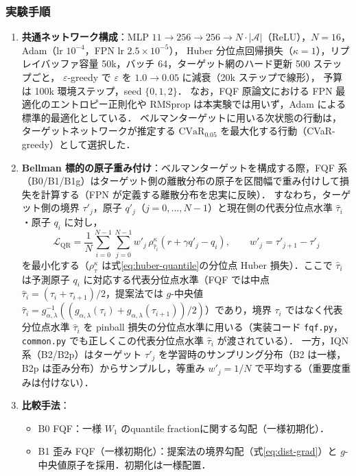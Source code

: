 \documentclass[a4paper,10pt]{jsarticle}
\theoremstyle{definition}
\newcommand{\CVaR}{\mathrm{CVaR}}
\newcommand{\Wone}{W_1}
\begin{document}
\subsubsection{実験手順}
\begin{enumerate}
  \item \textbf{共通ネットワーク構成}：MLP $11\to256\to256\to N\cdot|\mathcal A|$（ReLU），$N=16$，Adam（lr $10^{-4}$，FPN lr $2.5\times10^{-5}$），
  Huber 分位点回帰損失（$\kappa=1$），リプレイバッファ容量 50k，バッチ 64，ターゲット網のハード更新 500 ステップごと，
  $\varepsilon$-greedy で $\varepsilon$ を $1.0\to0.05$ に減衰（20k ステップで線形），
  予算は 100k 環境ステップ，seed $\{0,1,2\}$．
  なお，FQF 原論文における FPN 最適化のエントロピー正則化や RMSprop は本実験では用いず，Adam による標準的最適化としている．
  ベルマンターゲットに用いる次状態の行動は，ターゲットネットワークが推定する $\CVaR_{0.05}$ を最大化する行動（CVaR-greedy）として選択した．
  \item \textbf{Bellman 標的の原子重み付け}：ベルマンターゲットを構成する際，FQF 系（B0/B1/B1g）はターゲット側の離散分布の原子を区間幅で重み付けして損失を計算する（FPN が定義する離散分布を忠実に反映）．
  すなわち，ターゲット側の境界 $\tau'_j$，原子 $q'_j$（$j=0,\dots,N-1$）と現在側の代表分位点水準 $\hat\tau_i$・原子 $q_i$ に対し，
  \begin{equation}
    \mathcal{L}_{\mathrm{QR}}=\frac1N\sum_{i=0}^{N-1}\sum_{j=0}^{N-1} w'_j\,\rho^\kappa_{\hat\tau_i}\!\left(r+\gamma q'_j-q_i\right),\qquad w'_j=\tau'_{j+1}-\tau'_j
    \label{eq:b-loss}
  \end{equation}
  を最小化する（$\rho^\kappa_\tau$ は式\eqref{eq:huber-quantile}の分位点 Huber 損失）．ここで $\hat\tau_i$ は予測原子 $q_i$ に対応する代表分位点水準（FQF では中点 $\hat\tau_i=(\tau_i+\tau_{i+1})/2$，提案法では $g$-中央値 $\hat\tau_i=g_{\alpha,\lambda}^{-1}((g_{\alpha,\lambda}(\tau_i)+g_{\alpha,\lambda}(\tau_{i+1}))/2)$）であり，境界 $\tau_i$ ではなく代表分位点水準 $\hat\tau_i$ を pinball 損失の分位点水準に用いる（実装コード \texttt{fqf.py}，\texttt{common.py} でも正しくこの代表分位点水準 $\hat\tau_i$ が渡されている）．
  一方，IQN 系（B2/B2p）はターゲット $\tau'_j$ を学習時のサンプリング分布（B2 は一様，B2p は歪み分布）からサンプルし，等重み $w'_j=1/N$ で平均する（重要度重みは付けない）．
  \item \textbf{比較手法}：
  \begin{itemize}
    \item B0 FQF：一様 $\Wone$ のquantile fractionに関する勾配（一様初期化）．
    \item B1 歪み FQF（一様初期化）：提案法の境界勾配（式\eqref{eq:dist-grad}）と $g$-中央値原子を採用．初期化は一様配置．

\end{itemize}
\end{enumerate}
\end{document}
